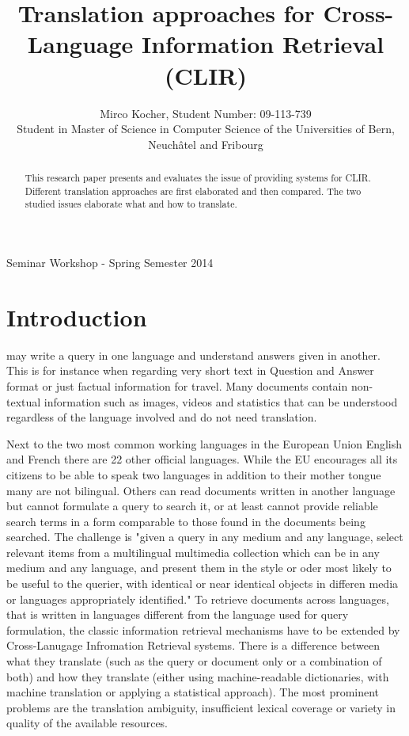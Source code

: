 \documentclass[journal]{IEEEtran}
\begin{document}
\title{ Translation approaches for Cross-Language Information
Retrieval (CLIR)}

\author{Mirco Kocher, Student Number: 09-113-739\\Student in Master of Science in
Computer Science of the Universities of Bern, Neuchâtel and Fribourg}

%
{Seminar Workshop - Spring Semester 2014}

\maketitle


\begin{abstract}
This research paper presents and evaluates the issue of providing
systems for CLIR. Different translation approaches are first elaborated and then compared.
The two studied issues elaborate what and how to translate.
\end{abstract}


\section{Introduction}
 may write a query in one language and understand answers given in another. This is for instance when regarding very short text in Question and Answer format or just factual information for travel. Many documents contain non-textual information such as images, videos and statistics that can be understood regardless of the language involved and do not need translation.

Next to the two most common working languages in the European Union English and French there are 22 other official languages. While the EU encourages all its citizens to be able to speak two languages in addition to their mother tongue many  are not bilingual. \cite{ebs386} Others can read documents written in another language but cannot formulate a query to search it, or at least cannot provide reliable search terms in a form comparable to those found in the documents being searched. The challenge is "given a query in any medium and any language, select relevant items from a multilingual multimedia collection which can be in any medium and any language, and present them in the style or oder most likely to be useful to the querier, with identical or near identical objects in differen media or languages appropriately identified." \cite{oard97} To retrieve documents across languages, that is written in languages different from the language used for query formulation, the classic information retrieval mechanisms have to be extended by Cross-Lanugage Infromation Retrieval systems. There is a difference between what they translate (such as the query or document only or a combination of both) and how they translate (either using machine-readable dictionaries, with machine translation or applying a statistical approach). The most prominent problems are the translation ambiguity, insufficient lexical coverage or variety in quality of the available resources.
\end{document}
